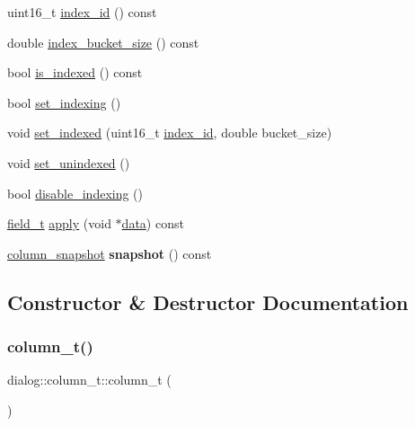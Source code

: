 \begin{DoxyCompactItemize}
\item 
uint16\+\_\+t \hyperlink{classdialog_1_1column__t_ac82b68223d597e807ac5bd4f5056b0c8}{index\+\_\+id} () const
\item 
double \hyperlink{classdialog_1_1column__t_aa43ce56355c469f098ebb2c5ee7d6ab9}{index\+\_\+bucket\+\_\+size} () const
\item 
bool \hyperlink{classdialog_1_1column__t_a61f7a157a27f4fa3d4a801db035e2166}{is\+\_\+indexed} () const
\item 
bool \hyperlink{classdialog_1_1column__t_ab9651b430ffa98ff36af3c643c591576}{set\+\_\+indexing} ()
\item 
void \hyperlink{classdialog_1_1column__t_a18cbf15074f6255b63438bf64d6622bf}{set\+\_\+indexed} (uint16\+\_\+t \hyperlink{classdialog_1_1column__t_ac82b68223d597e807ac5bd4f5056b0c8}{index\+\_\+id}, double bucket\+\_\+size)
\item 
void \hyperlink{classdialog_1_1column__t_abd10df62173d46d9189306cca8569494}{set\+\_\+unindexed} ()
\item 
bool \hyperlink{classdialog_1_1column__t_ad9c14144d0ca7ae53f84f9c7fe222db9}{disable\+\_\+indexing} ()
\item 
\hyperlink{structdialog_1_1field__t}{field\+\_\+t} \hyperlink{classdialog_1_1column__t_a73c2aee9091311707673a244d05cc99e}{apply} (void $\ast$\hyperlink{structdialog_1_1data}{data}) const
\item 
\mbox{\label{classdialog_1_1column__t_a74f17c57b3b6d9947d38a84c39590369}} 
\hyperlink{structdialog_1_1column__snapshot}{column\+\_\+snapshot} {\bfseries snapshot} () const
\end{DoxyCompactItemize}


\subsection{Constructor \& Destructor Documentation}
\mbox{\label{classdialog_1_1column__t_a294bc42fee87fb4e55542bda71a98843}} 
\subsubsection{\texorpdfstring{column\+\_\+t()}{column\_t()}\hspace{0.1cm}{\footnotesize\ttfamily [1/2]}}
{\footnotesize\ttfamily dialog\+::column\+\_\+t\+::column\+\_\+t (\begin{DoxyParamCaption}{ }\end{DoxyParamCaption})\hspace{0.3cm}{\ttfamily [inline]}}

